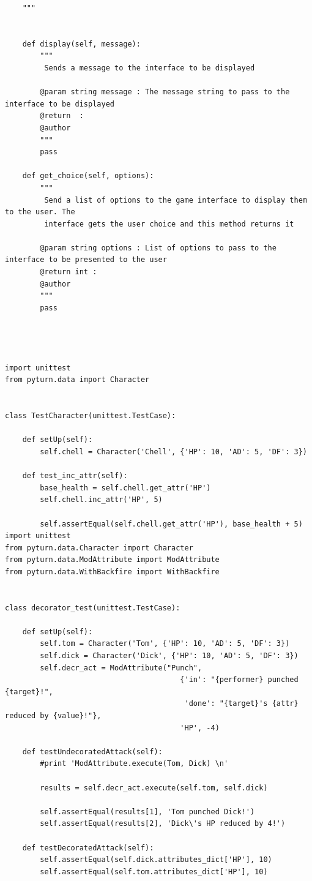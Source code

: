 \documentclass[11pt]{report}
\begin{document}
\begin{verbatim}
    """


    def display(self, message):
        """
         Sends a message to the interface to be displayed

        @param string message : The message string to pass to the interface to be displayed
        @return  :
        @author
        """
        pass

    def get_choice(self, options):
        """
         Send a list of options to the game interface to display them to the user. The
         interface gets the user choice and this method returns it

        @param string options : List of options to pass to the interface to be presented to the user
        @return int :
        @author
        """
        pass




import unittest
from pyturn.data import Character


class TestCharacter(unittest.TestCase):

    def setUp(self):
        self.chell = Character('Chell', {'HP': 10, 'AD': 5, 'DF': 3})

    def test_inc_attr(self):
        base_health = self.chell.get_attr('HP')
        self.chell.inc_attr('HP', 5)

        self.assertEqual(self.chell.get_attr('HP'), base_health + 5)
import unittest
from pyturn.data.Character import Character
from pyturn.data.ModAttribute import ModAttribute
from pyturn.data.WithBackfire import WithBackfire


class decorator_test(unittest.TestCase):

    def setUp(self):
        self.tom = Character('Tom', {'HP': 10, 'AD': 5, 'DF': 3})
        self.dick = Character('Dick', {'HP': 10, 'AD': 5, 'DF': 3})
        self.decr_act = ModAttribute("Punch",
                                        {'in': "{performer} punched {target}!",
                                         'done': "{target}'s {attr} reduced by {value}!"},
                                        'HP', -4)

    def testUndecoratedAttack(self):
        #print 'ModAttribute.execute(Tom, Dick) \n'
        
        results = self.decr_act.execute(self.tom, self.dick)

        self.assertEqual(results[1], 'Tom punched Dick!')
        self.assertEqual(results[2], 'Dick\'s HP reduced by 4!')

    def testDecoratedAttack(self):
        self.assertEqual(self.dick.attributes_dict['HP'], 10)
        self.assertEqual(self.tom.attributes_dict['HP'], 10)
        

\end{verbatim}
\end{document}
